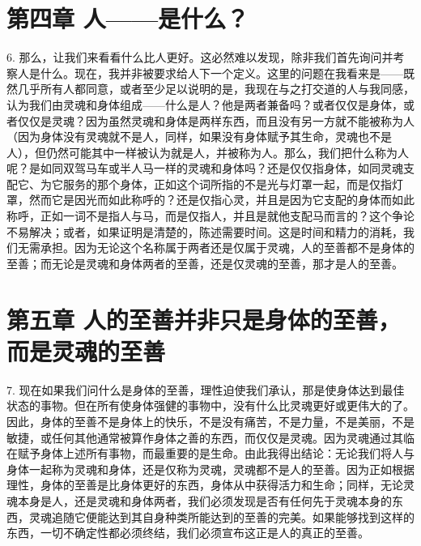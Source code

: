 
\section{第四章 人——是什么？}

6. 那么，让我们来看看什么比人更好。这必然难以发现，除非我们首先询问并考察人是什么。现在，我并非被要求给人下一个定义。这里的问题在我看来是——既然几乎所有人都同意，或者至少足以说明的是，我现在与之打交道的人与我同感，认为我们由灵魂和身体组成——什么是人？他是两者兼备吗？或者仅仅是身体，或者仅仅是灵魂？因为虽然灵魂和身体是两样东西，而且没有另一方就不能被称为人（因为身体没有灵魂就不是人，同样，如果没有身体赋予其生命，灵魂也不是人），但仍然可能其中一样被认为就是人，并被称为人。那么，我们把什么称为人呢？是如同双驾马车或半人马一样的灵魂和身体吗？还是仅仅指身体，如同灵魂支配它、为它服务的那个身体，正如这个词所指的不是光与灯罩一起，而是仅指灯罩，然而它是因光而如此称呼的？还是仅指心灵，并且是因为它支配的身体而如此称呼，正如一词不是指人与马，而是仅指人，并且是就他支配马而言的？这个争论不易解决；或者，如果证明是清楚的，陈述需要时间。这是时间和精力的消耗，我们无需承担。因为无论这个名称属于两者还是仅属于灵魂，人的至善都不是身体的至善；而无论是灵魂和身体两者的至善，还是仅灵魂的至善，那才是人的至善。\par


\section{第五章 人的至善并非只是身体的至善，而是灵魂的至善}

7. 现在如果我们问什么是身体的至善，理性迫使我们承认，那是使身体达到最佳状态的事物。但在所有使身体强健的事物中，没有什么比灵魂更好或更伟大的了。因此，身体的至善不是身体上的快乐，不是没有痛苦，不是力量，不是美丽，不是敏捷，或任何其他通常被算作身体之善的东西，而仅仅是灵魂。因为灵魂通过其临在赋予身体上述所有事物，而最重要的是生命。由此我得出结论：无论我们将人与身体一起称为灵魂和身体，还是仅称为灵魂，灵魂都不是人的至善。因为正如根据理性，身体的至善是比身体更好的东西，身体从中获得活力和生命；同样，无论灵魂本身是人，还是灵魂和身体两者，我们必须发现是否有任何先于灵魂本身的东西，灵魂追随它便能达到其自身种类所能达到的至善的完美。如果能够找到这样的东西，一切不确定性都必须终结，我们必须宣布这正是人的真正的至善。\par

